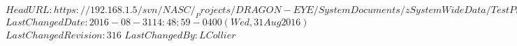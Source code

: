 \svnidlong
{$HeadURL: https://192.168.1.5/svn/NASC/_Projects/DRAGON-EYE/SystemDocuments/zSystemWideData/TestPrepProcs/TestCasePrep_AllRecords.tex $}
{$LastChangedDate: 2016-08-31 14:48:59 -0400 (Wed, 31 Aug 2016) $}
{$LastChangedRevision: 316 $}
{$LastChangedBy: LCollier $}








